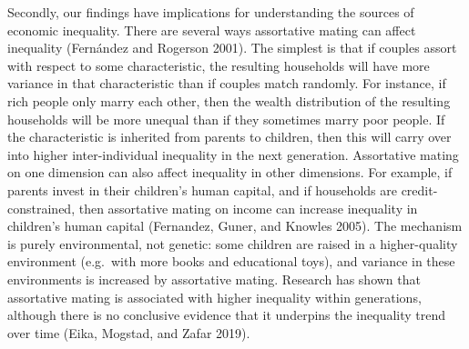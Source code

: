 \documentclass[
]{article}
\begin{document}
Secondly, our findings have implications for understanding the sources of
economic inequality. There are several ways assortative mating can affect
inequality (Fernández and Rogerson 2001). The simplest is that if couples assort with
respect to some characteristic, the resulting households will have more variance
in that characteristic than if couples match randomly. For instance, if rich
people only marry each other, then the wealth distribution of the resulting
households will be more unequal than if they sometimes marry poor people. If the
characteristic is inherited from parents to children, then this will carry over
into higher inter-individual inequality in the next generation. Assortative
mating on one dimension can also affect inequality in other dimensions. For
example, if parents invest in their children's human capital, and if households
are credit-constrained, then assortative mating on income can increase
inequality in children's human capital (Fernandez, Guner, and Knowles 2005). The mechanism is
purely environmental, not genetic: some children are raised in a higher-quality
environment (e.g.~with more books and educational toys), and variance in these
environments is increased by assortative mating. Research has shown that
assortative mating is associated with higher inequality within generations,
although there is no conclusive evidence that it underpins the inequality trend
over time (Eika, Mogstad, and Zafar 2019).
\end{document}
